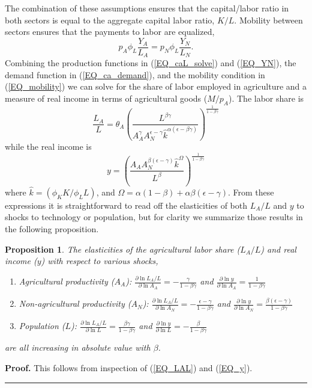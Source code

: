 \documentclass[11pt]{article}
\newtheorem{proposition}{Proposition}
\newenvironment{proof}[1][Proof]{\noindent\textbf{#1.} }{\ \rule{0.5em}{0.5em}}
\begin{document}
The combination of these assumptions ensures that the capital/labor ratio in both sectors is equal to the aggregate capital labor ratio, $K/L$. Mobility between sectors ensures that the payments to labor are equalized,
\begin{equation}
    p_A \phi_L \frac{Y_A}{L_A} = p_N \phi_L \frac{Y_N}{L_N}. \label{EQ_mobility}
\end{equation}
Combining the production functions in (\ref{EQ_caL_solve}) and (\ref{EQ_YN}), the demand function in (\ref{EQ_ca_demand}), and the mobility condition in (\ref{EQ_mobility}) we can solve for the share of labor employed in agriculture and a measure of real income in terms of agricultural goods ($M/p_A$). The labor share is
\begin{equation}
	\frac{L_A}{L} = \theta_A \left(\frac{L^{\beta\gamma}}{A_A^{\gamma} A_N^{\epsilon - \gamma} \hat{k}^{\alpha(\epsilon - \beta\gamma)}}\right)^{\frac{1}{1-\beta\gamma}} \label{EQ_LAL}
\end{equation}
while the real income is
\begin{equation}
	y = \left(\frac{A_A A_N^{\beta(\epsilon-\gamma)}\hat{k}^{\Omega}}{L^{\beta}} \right)^{\frac{1}{1-\beta\gamma}} \label{EQ_y}
\end{equation}
where $\hat{k} = (\phi_K K/\phi_L L)$, and $\Omega = \alpha(1-\beta) + \alpha\beta(\epsilon-\gamma)$. From these expressions it is straightforward to read off the elasticities of both $L_A/L$ and $y$ to shocks to technology or population, but for clarity we summarize those results in the following proposition. 

\begin{proposition}
The elasticities of the agricultural labor share ($L_A/L$) and real income ($y$) with respect to various shocks,
\begin{enumerate}
	\item[(a)] Agricultural productivity ($A_A$): $\frac{\partial \ln L_A/L}{\partial \ln A_A} = - \frac{\gamma}{1-\beta\gamma}$ and $\frac{\partial \ln y}{\partial \ln A_A} = \frac{1}{1-\beta\gamma}$
	\item[(b)] Non-agricultural productivity ($A_N$): $\frac{\partial \ln L_A/L}{\partial \ln A_N} = - \frac{\epsilon-\gamma}{1-\beta\gamma}$ and $\frac{\partial \ln y}{\partial \ln A_N} = \frac{\beta(\epsilon-\gamma)}{1-\beta\gamma}$
	\item[(c)] Population ($L$): $\frac{\partial \ln L_A/L}{\partial \ln L} = \frac{\beta\gamma}{1-\beta\gamma}$ and $\frac{\partial \ln y}{\partial \ln L} = - \frac{\beta}{1-\beta\gamma}$
\end{enumerate}
are all increasing in absolute value with $\beta$.
\end{proposition}
\begin{proof}
This follows from inspection of (\ref{EQ_LAL}) and (\ref{EQ_y}).
\end{proof}
\end{document}
